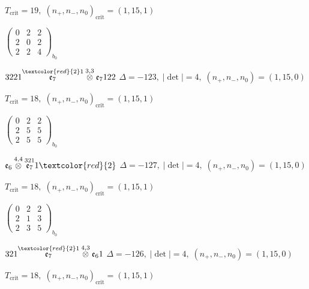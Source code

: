 \documentclass[10pt]{article}
\begin{document}
\hspace{1em}$T_{\text{crit}}=19,\; (n_+,n_-,n_0)_{\text{crit}}=(1,15,1)$

\hspace{2em}$\left(\begin{smallmatrix}0 & 2 & 2 \\ 2 & 0 & 2 \\ 2 & 2 & 4\end{smallmatrix}\right)_{\!b_0}$

\smallskip

$3221\overset{\textcolor{red}{2}1}{\mathfrak{e}_7}\overset{3,3}{\otimes}\mathfrak{e}_7122$ \quad $\Delta=-123,\; |\det|=4,\; (n_+,n_-,n_0)=(1,15,0)$

\hspace{1em}$T_{\text{crit}}=18,\; (n_+,n_-,n_0)_{\text{crit}}=(1,15,1)$

\hspace{2em}$\left(\begin{smallmatrix}0 & 2 & 2 \\ 2 & 5 & 5 \\ 2 & 5 & 5\end{smallmatrix}\right)_{\!b_0}$

\smallskip

$\mathfrak{e}_6\overset{4,4}{\otimes}\overset{321}{\mathfrak{e}_7}1\textcolor{red}{2}$ \quad $\Delta=-127,\; |\det|=4,\; (n_+,n_-,n_0)=(1,15,0)$

\hspace{1em}$T_{\text{crit}}=18,\; (n_+,n_-,n_0)_{\text{crit}}=(1,15,1)$

\hspace{2em}$\left(\begin{smallmatrix}0 & 2 & 2 \\ 2 & 1 & 3 \\ 2 & 3 & 5\end{smallmatrix}\right)_{\!b_0}$

\smallskip

$321\overset{\textcolor{red}{2}1}{\mathfrak{e}_7}\overset{4,3}{\otimes}\mathfrak{e}_61$ \quad $\Delta=-126,\; |\det|=4,\; (n_+,n_-,n_0)=(1,15,0)$

\hspace{1em}$T_{\text{crit}}=18,\; (n_+,n_-,n_0)_{\text{crit}}=(1,15,1)$
\end{document}
